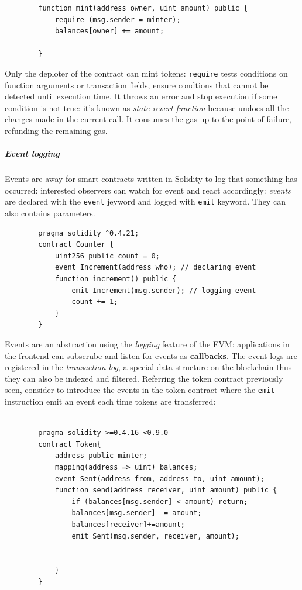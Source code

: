 \documentclass[10pt,a4paper]{report}
\begin{document}
	\begin{lstlisting}
		function mint(address owner, uint amount) public { 
			require (msg.sender = minter); 
			balances[owner] += amount; 
			
		}
	\end{lstlisting}
	
	Only the deploter of the contract can mint tokens: \texttt{require} tests conditions on function arguments or transaction fields, ensure condtions that cannot be detected until execution time. It throws an error and stop execution if some condition is not true: it's known as \textit{state revert function} because undoes all the changes made in the current call. It consumes the gas up to the point of failure, refunding the remaining gas.
	\subparagraph{Event logging}\label{sec:event-logging}
	Events are away for smart contracts written in Solidity to log that something has occurred: interested observers can watch for event and react accordingly: \textit{events} are declared with the \texttt{event} jeyword and logged with \texttt{emit} keyword. They can also contains parameters.
	\begin{lstlisting}
		pragma solidity ^0.4.21; 
		contract Counter { 
			uint256 public count = 0; 
			event Increment(address who); // declaring event 
			function increment() public { 
				emit Increment(msg.sender); // logging event 
				count += 1; 
			} 
		}
	\end{lstlisting}
	
	Events are an abstraction using the \textit{logging} feature of the EVM: applications in the frontend can subscrube and listen for events as \textbf{callbacks}. The event logs are registered in the \textit{transaction log}, a special data structure on the blockchain thus they can also be indexed and filtered.
	Referring the token contract previously seen, consider to introduce the events in the token contract where the \texttt{emit} instruction emit an event each time tokens are transferred:
	\begin{lstlisting}
		
		pragma solidity >=0.4.16 <0.9.0
		contract Token{
			address public minter;
			mapping(address => uint) balances;
			event Sent(address from, address to, uint amount);
			function send(address receiver, uint amount) public {
				if (balances[msg.sender] < amount) return;
				balances[msg.sender] -= amount;
				balances[receiver]+=amount;
				emit Sent(msg.sender, receiver, amount);
				
				
			}
		}
	\end{lstlisting}
\end{document}

